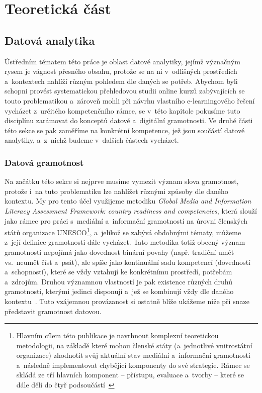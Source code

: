 \part{Teoretická část}

\hypertarget{datovuxe1-analytika}{%
\chapter{Datová analytika}\label{datovuxe1-analytika}}

Ústředním tématem této práce je oblast datové analytiky, jejímž význačným rysem je vágnost přesného obsahu, protože se na ni v~odlišných prostředích a~kontextech nahlíží různým pohledem dle daných se potřeb. Abychom byli schopni provést systematickou přehledovou studii online kurzů zabývajících se touto problematikou a~zároveň mohli při návrhu vlastního e-learningového řešení vycházet z~určitého kompetenčního rámce, se v~této kapitole pokusíme tuto disciplínu zarámovat do konceptů datové a~digitální gramotnosti. Ve druhé části této sekce se pak zaměříme na konkrétní kompetence, jež jsou součástí datové analytiky, a~z~nichž budeme v~dalších částech vycházet.

\hypertarget{datovuxe1-gramotnost}{%
\section{Datová gramotnost}\label{datovuxe1-gramotnost}}

Na začátku této sekce si nejprve musíme vymezit význam slova gramotnost, protože i~na tuto problematiku lze nahlížet různými způsoby dle daného kontextu. My pro tento účel využijeme metodiku \emph{Global Media and Information Literacy Assessment Framework: country readiness and competencies}, která slouží jako rámec pro práci s~mediální a~informační gramotností na úrovni členských států organizace UNESCO\footnote{Hlavním cílem této publikace je navrhnout komplexní teoretickou metodologii, na základě které mohou členské státy (a~jednotlivé vnitrostátní organizace) zhodnotit svůj aktuální stav mediální a~informační gramotnosti a~následně implementovat chybějící komponenty do své strategie. Rámec se skládá ze tří hlavních komponent – přístupu, evaluace a~tvorby – které se dále dělí do čtyř podsoučástí~\parencite{unesco13}}, a~jelikož se zabývá obdobnými tématy, můžeme z~její definice gramotnosti dále vycházet. Tato metodika totiž obecný význam gramotnosti nepojímá jako dovednost binární povahy (např. tradiční umět vs.~neumět číst a~psát), ale spíše jako kontinuální sadu kompetencí (dovedností a~schopností), které se vždy vztahují ke konkrétnímu prostředí, potřebám a~zdrojům. Druhou významnou vlastností je pak existence různých druhů gramotností, kterými jedinci disponují a~jež se kombinují vždy dle daného kontextu~\parencite{unesco13}. Tuto vzájemnou provázanost si ostatně blíže ukážeme níže při snaze představit gramotnost datovou.

